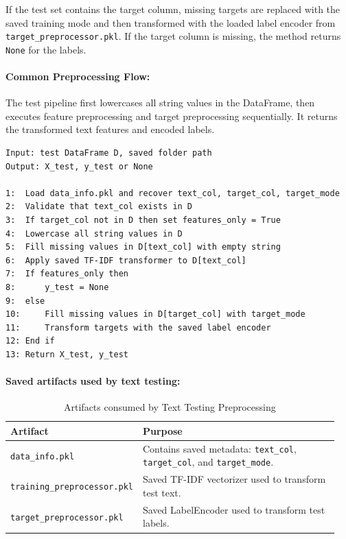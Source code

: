 If the test set contains the target column, missing targets are replaced with the saved training mode and then transformed with the loaded label encoder from \texttt{target\_preprocessor.pkl}. If the target column is missing, the method returns \texttt{None} for the labels.
\vspace{1cm}
\paragraph{Common Preprocessing Flow:}\par

The test pipeline first lowercases all string values in the DataFrame, then executes feature preprocessing and target preprocessing sequentially. It returns the transformed text features and encoded labels.
\vspace{0.5cm}

\begin{lstlisting}[style=algostyle,caption={Text Testing Preprocessing Pipeline},label={alg:text_testing_pipeline}]
Input: test DataFrame D, saved folder path
Output: X_test, y_test or None

1:  Load data_info.pkl and recover text_col, target_col, target_mode
2:  Validate that text_col exists in D
3:  If target_col not in D then set features_only = True
4:  Lowercase all string values in D
5:  Fill missing values in D[text_col] with empty string
6:  Apply saved TF-IDF transformer to D[text_col]
7:  If features_only then
8:      y_test = None
9:  else
10:     Fill missing values in D[target_col] with target_mode
11:     Transform targets with the saved label encoder
12: End if
13: Return X_test, y_test
\end{lstlisting}
\vspace{1cm}
\paragraph{Saved artifacts used by text testing:}\par

\begin{table}[!htbp]
\centering
\caption{Artifacts consumed by Text Testing Preprocessing}
\begin{tabular}{p{0.30\linewidth}p{0.65\linewidth}}
\toprule
\textbf{Artifact} & \textbf{Purpose}\\
\midrule
\texttt{data\_info.pkl} & Contains saved metadata: \texttt{text\_col}, \texttt{target\_col}, and \texttt{target\_mode}.\\
\texttt{training\_preprocessor.pkl} & Saved TF-IDF vectorizer used to transform test text.\\
\texttt{target\_preprocessor.pkl} & Saved LabelEncoder used to transform test labels.\\
\bottomrule
\end{tabular}
\end{table}
